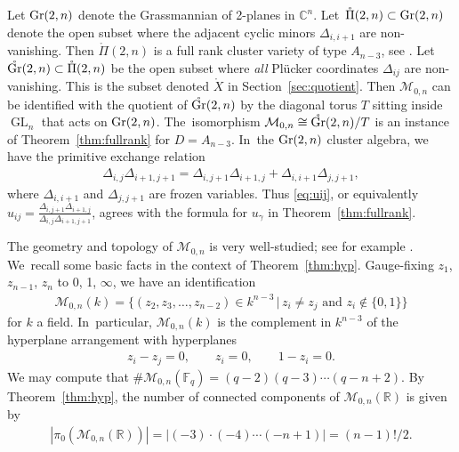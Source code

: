 \documentclass[pdftex]{sigma}%
\def\R{{\mathbb R}}
\def\C{{\mathbb C}}
\def\F{{\mathbb F}}
\def\Gr{{\rm Gr}}
\def\oPi{{\mathring{\Pi}}}
\def\oGr{{\mathring{\Gr}}}
\def\Xo{{\mathring{X}}}
\def\M{{\mathcal{M}}}
\def\GL{\operatorname{GL}}
\numberwithin{equation}{section}
\begin{document}
Let $\Gr(2,n)$ denote the Grassmannian of 2-planes in $\C^n$. Let~$\oPi(2,n)\subset \Gr(2,n)$ denote the open subset where the adjacent cyclic minors $\Delta_{i,i+1}$ are non-vanishing. Then $\oPi(2,n)$ is a full rank cluster variety of type $A_{n-3}$, see \cite[Section~12.2]{CA2}. Let~$\oGr(2,n) \subset \oPi(2,n)$ be the open subset where \emph{all} Pl\"ucker coordinates $\Delta_{ij}$ are non-vanishing. This is the subset denoted $\Xo$ in Section~\ref{sec:quotient}. Then $\M_{0,n}$ can be identified with the quotient of $\oGr(2,n)$ by the diagonal torus $T$ sitting inside $\GL_n$ that acts on $\Gr(2,n)$. The~isomorphism $\M_{0,n} \cong \oGr(2,n)/T$ is an instance of Theorem~\ref{thm:fullrank} for $D = A_{n-3}$. In~the $\Gr(2,n)$ cluster algebra, we have the primitive exchange relation
\begin{gather*}
\Delta_{i,j} \Delta_{i+1, j+1}= \Delta_{i, j+1}\Delta_{i+1,j} + \Delta_{i,i+1} \Delta_{j,j+1},
\end{gather*}
where $\Delta_{i,i+1}$ and $\Delta_{j,j+1}$ are frozen variables. Thus \eqref{eq:uij}, or equivalently $u_{ij} = \frac{ \Delta_{i, j+1}\Delta_{i+1,j} }{\Delta_{i,j} \Delta_{i+1, j+1}}$, agrees with the formula for $u_\gamma$ in Theorem~\ref{thm:fullrank}.

The geometry and topology of $\M_{0,n}$ is very well-studied; see for example \cite{Brown}. We~recall some basic facts in the context of Theorem~\ref{thm:hyp}. Gauge-fixing $z_1$, $z_{n-1}$, $z_n$ to 0, 1, $\infty$, we have an identification
\begin{gather*}
\M_{0,n}(k) = \big\{(z_2,z_3,\dots,z_{n-2})\in k^{n-3} \,|\, \mbox{$z_i \neq z_j$ and $z_i \notin \{0,1\}$}\big\}
\end{gather*}
for $k$ a field. In~particular, $\M_{0,n}(k)$ is the complement in $k^{n-3}$ of the hyperplane arrangement with hyperplanes
\begin{gather*}
z_i - z_j = 0, \qquad z_i = 0, \qquad 1-z_i =0.
\end{gather*}
We may compute that
$ \#\M_{0,n}(\F_q) = (q-2)(q-3)\cdots (q-n+2).
$
By Theorem~\ref{thm:hyp}, the number of connected components of $\M_{0,n}(\R)$ is given by
\begin{gather*}
|\pi_0(\M_{0,n}(\R))| = |(-3)\cdot (-4) \cdots (-n+1)| = (n-1)!/2.
\end{gather*}
\end{document}
